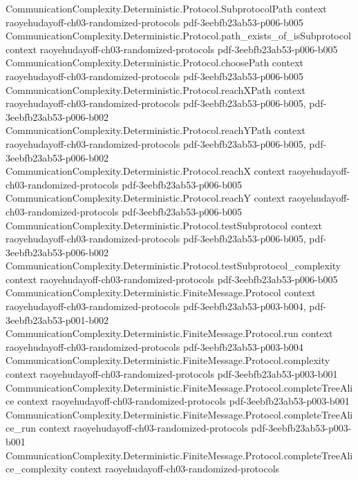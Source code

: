 \begin{theorem}
\proofstep
  {CommunicationComplexity.Deterministic.Protocol.SubprotocolPath}
  {context}
  {raoyehudayoff-ch03-randomized-protocols}
  {pdf-3eebfb23ab53-p006-b005}
\proofstep
  {CommunicationComplexity.Deterministic.Protocol.path_exists_of_isSubprotocol}
  {context}
  {raoyehudayoff-ch03-randomized-protocols}
  {pdf-3eebfb23ab53-p006-b005}
\proofstep
  {CommunicationComplexity.Deterministic.Protocol.choosePath}
  {context}
  {raoyehudayoff-ch03-randomized-protocols}
  {pdf-3eebfb23ab53-p006-b005}
\proofstep
  {CommunicationComplexity.Deterministic.Protocol.reachXPath}
  {context}
  {raoyehudayoff-ch03-randomized-protocols}
  {pdf-3eebfb23ab53-p006-b005,
    pdf-3eebfb23ab53-p006-b002}
\proofstep
  {CommunicationComplexity.Deterministic.Protocol.reachYPath}
  {context}
  {raoyehudayoff-ch03-randomized-protocols}
  {pdf-3eebfb23ab53-p006-b005,
    pdf-3eebfb23ab53-p006-b002}
\proofstep
  {CommunicationComplexity.Deterministic.Protocol.reachX}
  {context}
  {raoyehudayoff-ch03-randomized-protocols}
  {pdf-3eebfb23ab53-p006-b005}
\proofstep
  {CommunicationComplexity.Deterministic.Protocol.reachY}
  {context}
  {raoyehudayoff-ch03-randomized-protocols}
  {pdf-3eebfb23ab53-p006-b005}
\proofstep
  {CommunicationComplexity.Deterministic.Protocol.testSubprotocol}
  {context}
  {raoyehudayoff-ch03-randomized-protocols}
  {pdf-3eebfb23ab53-p006-b005,
    pdf-3eebfb23ab53-p006-b002}
\proofstep
  {CommunicationComplexity.Deterministic.Protocol.testSubprotocol_complexity}
  {context}
  {raoyehudayoff-ch03-randomized-protocols}
  {pdf-3eebfb23ab53-p006-b005}
\proofstep
  {CommunicationComplexity.Deterministic.FiniteMessage.Protocol}
  {context}
  {raoyehudayoff-ch03-randomized-protocols}
  {pdf-3eebfb23ab53-p003-b004,
    pdf-3eebfb23ab53-p001-b002}
\proofstep
  {CommunicationComplexity.Deterministic.FiniteMessage.Protocol.run}
  {context}
  {raoyehudayoff-ch03-randomized-protocols}
  {pdf-3eebfb23ab53-p003-b004}
\proofstep
  {CommunicationComplexity.Deterministic.FiniteMessage.Protocol.complexity}
  {context}
  {raoyehudayoff-ch03-randomized-protocols}
  {pdf-3eebfb23ab53-p003-b001}
\proofstep
  {CommunicationComplexity.Deterministic.FiniteMessage.Protocol.completeTreeAlice}
  {context}
  {raoyehudayoff-ch03-randomized-protocols}
  {pdf-3eebfb23ab53-p003-b001}
\proofstep
  {CommunicationComplexity.Deterministic.FiniteMessage.Protocol.completeTreeAlice_run}
  {context}
  {raoyehudayoff-ch03-randomized-protocols}
  {pdf-3eebfb23ab53-p003-b001}
\proofstep
  {CommunicationComplexity.Deterministic.FiniteMessage.Protocol.completeTreeAlice_complexity}
  {context}
  {raoyehudayoff-ch03-randomized-protocols}

\end{theorem}
